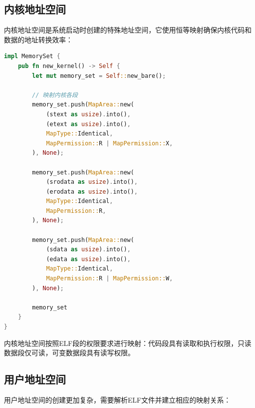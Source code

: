 \subsection{内核地址空间}

内核地址空间是系统启动时创建的特殊地址空间，它使用恒等映射确保内核代码和数据的地址转换效率：

\begin{lstlisting}[language=Rust,caption={内核地址空间创建}, label={lst:kernel-memory-set}]
impl MemorySet {
    pub fn new_kernel() -> Self {
        let mut memory_set = Self::new_bare();
        
        // 映射内核各段
        memory_set.push(MapArea::new(
            (stext as usize).into(),
            (etext as usize).into(), 
            MapType::Identical,
            MapPermission::R | MapPermission::X,
        ), None);
        
        memory_set.push(MapArea::new(
            (srodata as usize).into(),
            (erodata as usize).into(),
            MapType::Identical, 
            MapPermission::R,
        ), None);
        
        memory_set.push(MapArea::new(
            (sdata as usize).into(),
            (edata as usize).into(),
            MapType::Identical,
            MapPermission::R | MapPermission::W,
        ), None);
        
        memory_set
    }
}
\end{lstlisting}

内核地址空间按照ELF段的权限要求进行映射：代码段具有读取和执行权限，只读数据段仅可读，可变数据段具有读写权限。

\subsection{用户地址空间}

用户地址空间的创建更加复杂，需要解析ELF文件并建立相应的映射关系：

